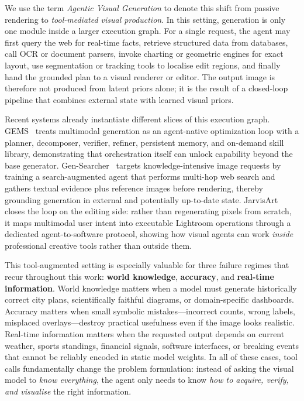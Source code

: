 We use the term \emph{Agentic Visual Generation} to denote this shift from passive rendering to \emph{tool-mediated visual production}. In this setting, generation is only one module inside a larger execution graph. For a single request, the agent may first query the web for real-time facts, retrieve structured data from databases, call OCR or document parsers, invoke charting or geometric engines for exact layout, use segmentation or tracking tools to localise edit regions, and finally hand the grounded plan to a visual renderer or editor. The output image is therefore not produced from latent priors alone; it is the result of a closed-loop pipeline that combines external state with learned visual priors.

Recent systems already instantiate different slices of this execution graph. GEMS~\citep{he2026gems} treats multimodal generation as an agent-native optimization loop with a planner, decomposer, verifier, refiner, persistent memory, and on-demand skill library, demonstrating that orchestration itself can unlock capability beyond the base generator. Gen-Searcher~\citep{feng2026gen} targets knowledge-intensive image requests by training a search-augmented agent that performs multi-hop web search and gathers textual evidence plus reference images before rendering, thereby grounding generation in external and potentially up-to-date state. JarvisArt~\citep{lin2025jarvisart} closes the loop on the editing side: rather than regenerating pixels from scratch, it maps multimodal user intent into executable Lightroom operations through a dedicated agent-to-software protocol, showing how visual agents can work \emph{inside} professional creative tools rather than outside them.

This tool-augmented setting is especially valuable for three failure regimes that recur throughout this work: \textbf{world knowledge}, \textbf{accuracy}, and \textbf{real-time information}. World knowledge matters when a model must generate historically correct city plans, scientifically faithful diagrams, or domain-specific dashboards. Accuracy matters when small symbolic mistakes---incorrect counts, wrong labels, misplaced overlays---destroy practical usefulness even if the image looks realistic. Real-time information matters when the requested output depends on current weather, sports standings, financial signals, software interfaces, or breaking events that cannot be reliably encoded in static model weights. In all of these cases, tool calls fundamentally change the problem formulation: instead of asking the visual model to \emph{know everything}, the agent only needs to know \emph{how to acquire, verify, and visualise} the right information.

